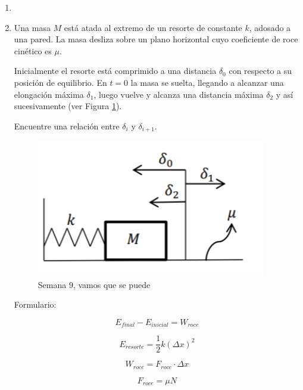 \documentclass[letterpaper,11pt]{article}
\begin{document}
\vspace{-1cm}
\begin{enumerate}\setlength{\itemsep}{0.4cm}


\item[]

\item Una masa $M$ está atada al extremo de un resorte de constante $k$, adosado a una pared. La masa desliza sobre un plano horizontal cuyo coeficiente de roce cinético es $\mu$.

Inicialmente el resorte está comprimido a una distancia $\delta_0$ con respecto a su posición de equilibrio. En $t=0$ la masa se suelta, llegando a alcanzar una elongación máxima $\delta_1$, luego vuelve y alcanza una distancia máxima $\delta_2$ y así sucesivamente (ver Figura \ref{fig:ej6}).

Encuentre una relación entre $\delta_i$ y $\delta_{i+1}$.

\begin{figure}[H]
    \centering
    \includegraphics[width=10cm]{2021-2/img/ejercicios/imagen_ej6.png}
    \caption{Semana 9, vamos que se puede}
    \label{fig:ej6}
\end{figure}

Formulario:

\begin{equation}
    E_{final}-E_{inicial}=W_{roce}
\end{equation}

\begin{equation}
    E_{resorte}=\frac{1}{2}k(\Delta x)^2
\end{equation}

\begin{equation}
    W_{roce}=F_{roce} \cdot \Delta x
\end{equation}

\begin{equation}
    F_{roce}=\mu N
\end{equation}


%   

\end{enumerate}
\end{document}
